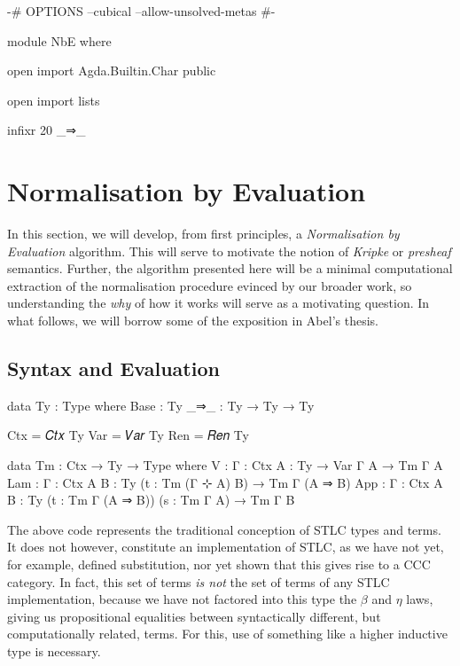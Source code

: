 \begin{code}[hide]
{-# OPTIONS --cubical --allow-unsolved-metas #-}

module NbE where

open import Agda.Builtin.Char public

open import lists

infixr 20 _⇒_
\end{code}

\section{Normalisation by Evaluation}

In this section, we will develop, from first principles, a \emph{Normalisation
by Evaluation} algorithm. This will serve to motivate the notion of
\emph{Kripke} or \emph{presheaf} semantics. Further, the algorithm presented
here will be a minimal computational extraction of the normalisation procedure
evinced by our broader work, so understanding the \emph{why} of how it works
will serve as a motivating question. In what follows, we will borrow some of
the exposition in Abel's thesis.

\subsection{Syntax and Evaluation}

\begin{code}
data Ty : Type where
  Base : Ty
  _⇒_ : Ty → Ty → Ty

Ctx = 𝐶𝑡𝑥 Ty
Var = 𝑉𝑎𝑟 Ty
Ren = 𝑅𝑒𝑛 Ty

data Tm : Ctx → Ty → Type where
  V : {Γ : Ctx} {A : Ty} → Var Γ A → Tm Γ A
  Lam : {Γ : Ctx} {A B : Ty} (t : Tm (Γ ⊹ A) B) → Tm Γ (A ⇒ B)
  App : {Γ : Ctx} {A B : Ty} (t : Tm Γ (A ⇒ B)) (s : Tm Γ A) → Tm Γ B
\end{code}

\clearpage

The above code represents the traditional conception of STLC types and terms.
It does not however, constitute an implementation of STLC, as we have not yet,
for example, defined substitution, nor yet shown that this gives rise to a
CCC category. In fact, this set of terms \emph{is not} the set of terms of any
STLC implementation, because we have not factored into this type the $\beta$
and $\eta$ laws, giving us propositional equalities between syntactically
different, but computationally related, terms. For this, use of something like
a higher inductive type is necessary.

